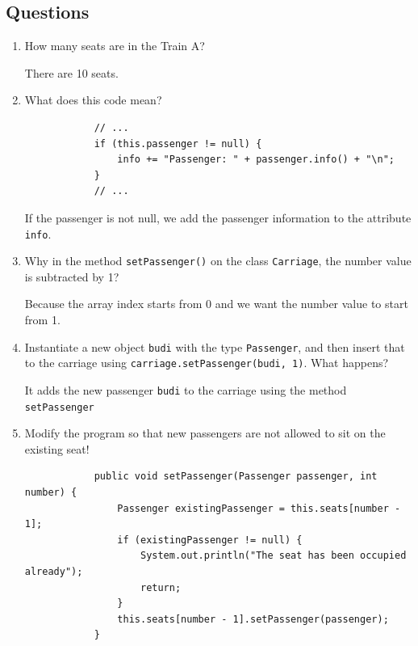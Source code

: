 \documentclass[12pt,titlepage]{article}
\begin{document}
\subsection{Questions}
\begin{enumerate}
    \item {
        How many seats are in the Train A?

        There are 10 seats.
    }
    \item {
        What does this code mean?

        \begin{verbatim}
            // ...
            if (this.passenger != null) {
                info += "Passenger: " + passenger.info() + "\n";
            }
            // ...
        \end{verbatim}

        If the passenger is not null, we add the passenger information to the attribute \texttt{info}.
    }
    \item {
        Why in the method \texttt{setPassenger()} on the class \texttt{Carriage}, the number value is subtracted by 1?

        Because the array index starts from 0 and we want the number value to start from 1.
    }
    \item {
        Instantiate a new object \texttt{budi} with the type \texttt{Passenger}, and then insert that to the
        carriage using \texttt{carriage.setPassenger(budi, 1)}. What happens?

        It adds the new passenger \texttt{budi} to the carriage using the method \texttt{setPassenger}
    }
    \item {
        Modify the program so that new passengers are not allowed to sit on the existing seat!

        \begin{verbatim}
            public void setPassenger(Passenger passenger, int number) {
                Passenger existingPassenger = this.seats[number - 1];
                if (existingPassenger != null) {
                    System.out.println("The seat has been occupied already");
                    return;
                }
                this.seats[number - 1].setPassenger(passenger);
            }
        \end{verbatim}
    }
\end{enumerate}

\pagebreak
\end{document}

